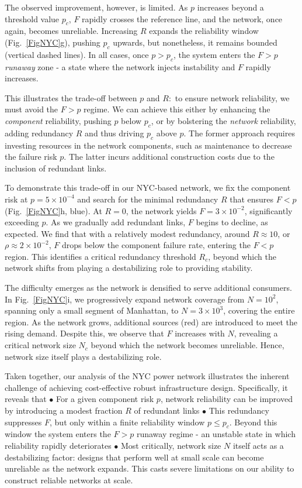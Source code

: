 \documentclass[oneside, a4paper, onecolumn, 11pt]{article}
\begin{document}
\begin{refsection}
The observed improvement, however, is limited. As $p$ increases beyond a threshold value $p_c$, $F$ rapidly crosses the reference line, and the network, once again, becomes unreliable. Increasing $R$ expands the reliability window (Fig.\ \ref{FigNYC}g), pushing $p_c$ upwards, but nonetheless, it remains bounded (vertical dashed lines). In all cases, once $p > p_c$, the system enters the $F > p$ \textit{runaway} zone - a state where the network injects instability and $F$ rapidly increases.

This illustrates the trade-off between $p$ and $R$:\ to ensure network reliability, we must avoid the $F > p$ regime. We can achieve this either by enhancing the \textit{component} reliability, pushing $p$ below $p_c$, or by bolstering the \textit{network} reliability, adding redundancy $R$ and thus driving $p_c$ above $p$. The former approach requires investing resources in the network components, such as maintenance to decrease the failure risk $p$. The latter incurs additional construction costs due to the inclusion of redundant links. 

To demonstrate this trade-off in our NYC-based network, we fix the component risk at $p = 5 \times 10^{-4}$ and search for the minimal redundancy $R$ that ensures $F < p$ (Fig.\ \ref{FigNYC}h, blue). At $R = 0$, the network yields $F = 3 \times 10^{-2}$, significantly exceeding $p$. As we gradually add redundant links, $F$ begins to decline, as expected. We find that with a relatively modest redundancy, around $R \approx 10$, or $\rho \approx 2 \times 10^{-2}$, $F$ drops below the component failure rate, entering the $F < p$ region. This identifies a critical redundancy threshold $R_c$, beyond which the network shifts from playing a destabilizing role to providing stability.        

The difficulty emerges as the network is densified to serve additional consumers. In Fig.\ \ref{FigNYC}i, we progressively expand network coverage from $N = 10^2$, spanning only a small segment of Manhattan, to $N = 3 \times 10^3$, covering the entire region. As the network grows, additional sources (red) are introduced to meet the rising demand. Despite this, we observe that $F$ increases with $N$, revealing a critical network size $N_c$ beyond which the network becomes unreliable. Hence, network size itself plays a destabilizing role.

Taken together, our analysis of the NYC power network illustrates the inherent challenge of achieving cost-effective robust infrastructure design. Specifically, it reveals that
$\bullet$
For a given component risk $p$, network reliability can be improved by introducing a modest fraction $R$ of redundant links
$\bullet$ 
This redundancy suppresses $F$, but only within a finite reliability window $p \le p_c$. Beyond this window the system enters the $F > p$ runaway regime - an unstable state in which reliability rapidly deteriorates
$\bullet$
Most critically, network size $N$ itself acts as a destabilizing factor: designs that perform well at small scale can become unreliable as the network expands. This casts severe limitations on our ability to construct reliable networks at scale. 


\end{refsection}
\end{document}
